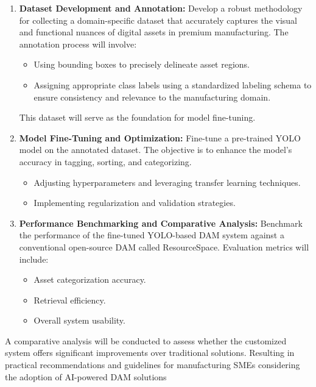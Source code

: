 \documentclass[a4paper,12pt,twocolumn]{article}
\numberwithin{figure}{section}
\numberwithin{table}{section}
\begin{document}
\begin{enumerate} 
    
    \item \textbf{Dataset Development and Annotation:}
    Develop a robust methodology for collecting a domain-specific dataset that 
    accurately captures the visual and functional nuances of digital assets 
    in premium manufacturing. The annotation process will involve: 
    \begin{itemize} 
        \item Using bounding boxes to precisely delineate asset regions. 
        \item Assigning appropriate class labels using a standardized labeling schema 
        to ensure consistency and relevance to the manufacturing domain. 
    \end{itemize}
    
    This dataset will serve as the foundation for model fine-tuning.

    \item \textbf{Model Fine-Tuning and Optimization:}  
    Fine-tune a pre-trained YOLO model on the annotated dataset. 
    The objective is to enhance the model’s 
    accuracy in tagging, sorting, and categorizing.
    \begin{itemize}
        \item Adjusting hyperparameters and leveraging transfer learning techniques.
        \item Implementing regularization and validation strategies.
    \end{itemize}

    \item \textbf{Performance Benchmarking and Comparative Analysis:}  
    Benchmark the performance of the fine-tuned YOLO-based DAM system against a 
    conventional open-source DAM called ResourceSpace. Evaluation metrics will include:
    \begin{itemize}
        \item Asset categorization accuracy.
        \item Retrieval efficiency.
        \item Overall system usability.
    \end{itemize}
\end{enumerate}

A comparative analysis will be conducted to assess whether the customized 
system offers significant improvements over traditional solutions. 
Resulting in practical recommendations 
and guidelines for manufacturing SMEs 
considering the adoption of AI-powered
DAM solutions
\end{document}
